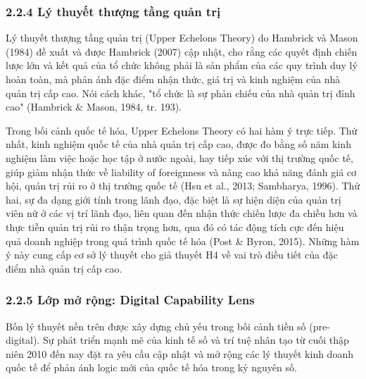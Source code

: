 \documentclass[12pt,a4paper]{article}
\begin{document}
\hypertarget{224-luxfd-thuyux1ebft-thux1b0ux1ee3ng-tux1ea7ng-quux1ea3n-trux1ecb}{%
\subsubsection{2.2.4 Lý thuyết thượng tầng quản
trị}\label{224-luxfd-thuyux1ebft-thux1b0ux1ee3ng-tux1ea7ng-quux1ea3n-trux1ecb}}

Lý thuyết thượng tầng quản trị (Upper Echelons Theory) do Hambrick và
Mason (1984) đề xuất và được Hambrick (2007) cập nhật, cho rằng các
quyết định chiến lược lớn và kết quả của tổ chức không phải là sản phẩm
của các quy trình duy lý hoàn toàn, mà phản ánh đặc điểm nhận thức, giá
trị và kinh nghiệm của nhà quản trị cấp cao. Nói cách khác, "tổ chức là
sự phản chiếu của nhà quản trị đỉnh cao" (Hambrick \& Mason, 1984, tr.
193).

Trong bối cảnh quốc tế hóa, Upper Echelons Theory có hai hàm ý trực
tiếp. Thứ nhất, kinh nghiệm quốc tế của nhà quản trị cấp cao, được đo
bằng số năm kinh nghiệm làm việc hoặc học tập ở nước ngoài, hay tiếp xúc
với thị trường quốc tế, giúp giảm nhận thức về liability of foreignness
và nâng cao khả năng đánh giá cơ hội, quản trị rủi ro ở thị trường quốc
tế (Hsu et al., 2013; Sambharya, 1996). Thứ hai, sự đa dạng giới tính
trong lãnh đạo, đặc biệt là sự hiện diện của quản trị viên nữ ở các vị
trí lãnh đạo, liên quan đến nhận thức chiến lược đa chiều hơn và thực
tiễn quản trị rủi ro thận trọng hơn, qua đó có tác động tích cực đến
hiệu quả doanh nghiệp trong quá trình quốc tế hóa (Post \& Byron, 2015).
Những hàm ý này cung cấp cơ sở lý thuyết cho giả thuyết H4 về vai trò
điều tiết của đặc điểm nhà quản trị cấp cao.

\hypertarget{225-lux1edbp-mux1edf-rux1ed9ng-digital-capability-lens}{%
\subsubsection{2.2.5 Lớp mở rộng: Digital Capability
Lens}\label{225-lux1edbp-mux1edf-rux1ed9ng-digital-capability-lens}}

Bốn lý thuyết nền trên được xây dựng chủ yếu trong bối cảnh tiền số
(pre-digital). Sự phát triển mạnh mẽ của kinh tế số và trí tuệ nhân tạo
từ cuối thập niên 2010 đến nay đặt ra yêu cầu cập nhật và mở rộng các lý
thuyết kinh doanh quốc tế để phản ánh logic mới của quốc tế hóa trong kỷ
nguyên số.
\end{document}
